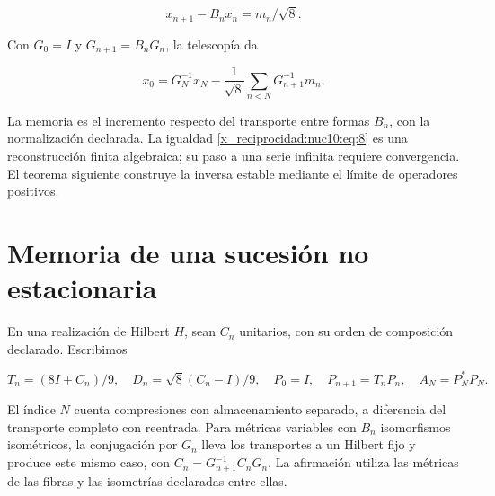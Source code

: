 \begin{equation}
x_{n+1}-B_nx_n=m_n/\sqrt8.
\label{x_reciprocidad:nuc10:eq:7}
\end{equation}



Con \(G_0=I\) y \(G_{n+1}=B_nG_n\), la telescopía da



\begin{equation}
x_0=G_N^{-1}x_N-\frac1{\sqrt8}\sum_{n<N}G_{n+1}^{-1}m_n.
\label{x_reciprocidad:nuc10:eq:8}
\end{equation}



La memoria es el incremento respecto del transporte entre formas \(B_n\), con la normalización declarada. La igualdad \eqref{x_reciprocidad:nuc10:eq:8} es una reconstrucción finita algebraica; su paso a una serie infinita requiere convergencia. El teorema siguiente construye la inversa estable mediante el límite de operadores positivos.

\section{Memoria de una sucesión no estacionaria}

En una realización de Hilbert \(H\), sean \(C_n\) unitarios, con su orden de composición declarado. Escribimos



\[
T_n=(8I+C_n)/9,\quad D_n=\sqrt8(C_n-I)/9,
\quad P_0=I,\quad P_{n+1}=T_nP_n,\quad A_N=P_N^*P_N.
\]



El índice \(N\) cuenta compresiones con almacenamiento separado, a diferencia del transporte completo con reentrada. Para métricas variables con \(B_n\) isomorfismos isométricos, la conjugación por \(G_n\) lleva los transportes a un Hilbert fijo y produce este mismo caso, con \(\widetilde C_n=G_{n+1}^{-1}C_nG_n\). La afirmación utiliza las métricas de las fibras y las isometrías declaradas entre ellas.

